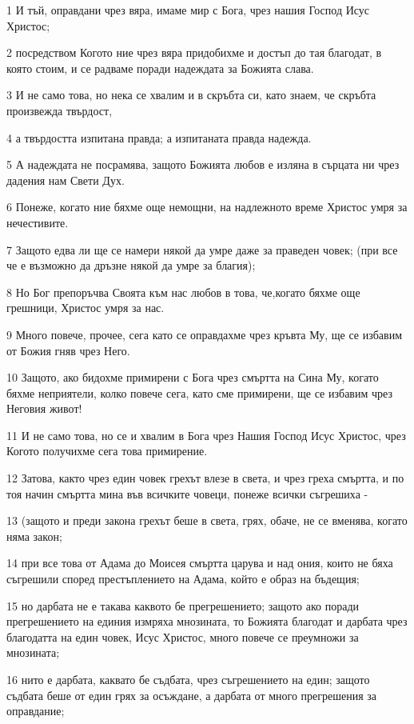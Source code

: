 \par 1 И тъй, оправдани чрез вяра, имаме мир с Бога, чрез нашия Господ Исус Христос;
\par 2 посредством Когото ние чрез вяра придобихме и достъп до тая благодат, в която стоим, и се радваме поради надеждата за Божията слава.
\par 3 И не само това, но нека се хвалим и в скръбта си, като знаем, че скръбта произвежда твърдост,
\par 4 а твърдостта изпитана правда; а изпитаната правда надежда.
\par 5 А надеждата не посрамява, защото Божията любов е изляна в сърцата ни чрез дадения нам Свети Дух.
\par 6 Понеже, когато ние бяхме още немощни, на надлежното време Христос умря за нечестивите.
\par 7 Защото едва ли ще се намери някой да умре даже за праведен човек; (при все че е възможно да дръзне някой да умре за благия);
\par 8 Но Бог препоръчва Своята към нас любов в това, че,когато бяхме още грешници, Христос умря за нас.
\par 9 Много повече, прочее, сега като се оправдахме чрез кръвта Му, ще се избавим от Божия гняв чрез Него.
\par 10 Защото, ако бидохме примирени с Бога чрез смъртта на Сина Му, когато бяхме неприятели, колко повече сега, като сме примирени, ще се избавим чрез Неговия живот!
\par 11 И не само това, но се и хвалим в Бога чрез Нашия Господ Исус Христос, чрез Когото получихме сега това примирение.
\par 12 Затова, както чрез един човек грехът влезе в света, и чрез греха смъртта, и по тоя начин смъртта мина във всичките човеци, понеже всички съгрешиха -
\par 13 (защото и преди закона грехът беше в света, грях, обаче, не се вменява, когато няма закон;
\par 14 при все това от Адама до Моисея смъртта царува и над ония, които не бяха съгрешили според престъплението на Адама, който е образ на бъдещия;
\par 15 но дарбата не е такава каквото бе прегрешението; защото ако поради прегрешението на единия измряха мнозината, то Божията благодат и дарбата чрез благодатта на един човек, Исус Христос, много повече се преумножи за мнозината;
\par 16 нито е дарбата, каквато бе съдбата, чрез съгрешението на един; защото съдбата беше от един грях за осъждане, а дарбата от много прегрешения за оправдание;
